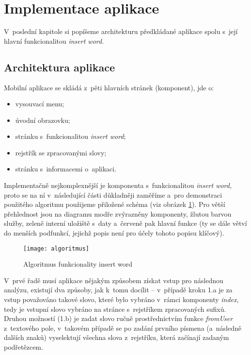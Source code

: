 \hypertarget{implementace-aplikace}{%
\section{Implementace aplikace}\label{implementace-aplikace}}

V~poslední kapitole si popíšeme architekturu předkládané aplikace spolu
s~její hlavní funkcionalitou \emph{insert word.}

\hypertarget{architektura-aplikace}{%
\subsection{Architektura aplikace}\label{architektura-aplikace}}

Mobilní aplikace se skládá z~pěti hlavních stránek (komponent), jde o:

\begin{itemize}
\tightlist
\item
  vysouvací menu;
\item
  úvodní obrazovku;
\item
  stránku s~funkcionalitou \emph{insert word};
\item
  rejstřík se zpracovanými slovy;
\item
  stránku s~informacemi o~aplikaci.
\end{itemize}

Implementačně nejkomplexnější je komponenta s~funkcionalitou
\emph{insert word}, proto se na ní v~následující části důkladněji
zaměříme a~pro demonstraci použitého algoritmu použijeme přiložené
schéma (viz obrázek \ref{algoritmus}). Pro větší přehlednost jsou na
diagramu modře zvýrazněny komponenty, žlutou barvou služby, zeleně
interní uložiště s~daty a~červeně pak hlavní funkce (ty se dále větví do
menších podfunkcí, jejichž popis není pro účely tohoto popisu klíčový).

\begin{figure}[ht]   
    \centering
    \texttt{[image: algoritmus]}  
    \caption{Algoritmus funkcionality insert word}
    \label{algoritmus}
 \end{figure}

V~prvé řadě musí aplikace nějakým způsobem získat vstup pro následnou
analýzu, existují dva způsoby, jak k~tomu docílit -- v~případě kroku 1.a
je za vstup považováno takové slovo, které bylo vybráno v~rámci
komponenty \emph{index}, tedy je vstupní slovo vybráno na stránce
s~rejstříkem zpracovaných sufixů. Druhou možností (1.b) je zadat slovo
ručně prostřednictvím funkce \emph{fromUser} z~textového pole, v~takovém
případě se po zadání prvního písmena (a~následně dalších znaků)
vyselektují všechna slova z~rejstříku, která začínají zadaným
podřetězcem.


